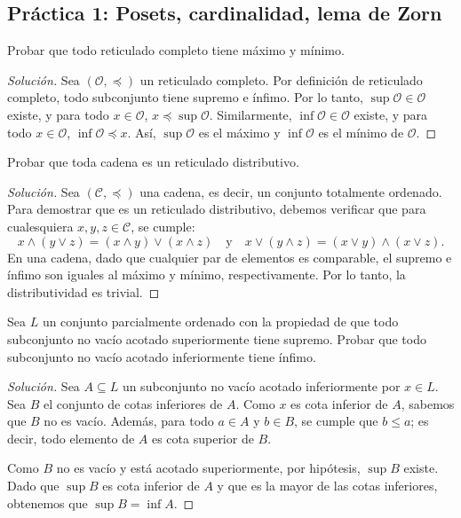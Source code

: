 \subsection*{Práctica 1: Posets, cardinalidad, lema de Zorn}

\begin{exercise}[1]
    Probar que todo reticulado completo tiene máximo y mínimo.
\end{exercise}

\begin{proof}[Solución]
    Sea $(\mathcal{O}, \preceq)$ un reticulado completo. Por definición de reticulado completo, todo subconjunto tiene supremo e ínfimo. Por lo tanto, $\sup \mathcal{O} \in \mathcal{O}$ existe, y para todo $x \in \mathcal{O}$, $x \preceq \sup \mathcal{O}$. Similarmente, $\inf \mathcal{O} \in \mathcal{O}$ existe, y para todo $x \in \mathcal{O}$, $\inf \mathcal{O} \preceq x$. Así, $\sup \mathcal{O}$ es el máximo y $\inf \mathcal{O}$ es el mínimo de $\mathcal{O}$.
\end{proof}

\begin{exercise}[2]
    Probar que toda cadena es un reticulado distributivo.
\end{exercise}

\begin{proof}[Solución]
    Sea $(\mathcal{C}, \preceq)$ una cadena, es decir, un conjunto totalmente ordenado. Para demostrar que es un reticulado distributivo, debemos verificar que para cualesquiera $x, y, z \in \mathcal{C}$, se cumple:
    $$
    x \wedge (y \vee z) = (x \wedge y) \vee (x \wedge z) \quad \text{y} \quad x \vee (y \wedge z) = (x \vee y) \wedge (x \vee z).
    $$
    En una cadena, dado que cualquier par de elementos es comparable, el supremo e ínfimo son iguales al máximo y mínimo, respectivamente. Por lo tanto, la distributividad es trivial.
\end{proof}

\begin{exercise}[3]
    Sea $L$ un conjunto parcialmente ordenado con la propiedad de que todo subconjunto no vacío acotado superiormente tiene supremo. Probar que todo subconjunto no vacío acotado inferiormente tiene ínfimo.
\end{exercise}

\begin{proof}[Solución]
    Sea $A \subseteq L$ un subconjunto no vacío acotado inferiormente por $x \in L$. Sea $B$ el conjunto de cotas inferiores de $A$. Como $x$ es cota inferior de $A$, sabemos que $B$ no es vacío. Además, para todo $a \in A$ y $b \in B$, se cumple que $b \leq a$; es decir, todo elemento de $A$ es cota superior de $B$. 

    Como $B$ no es vacío y está acotado superiormente, por hipótesis, $\sup B$ existe. Dado que $\sup B$ es cota inferior de $A$ y que es la mayor de las cotas inferiores, obtenemos que $\sup B = \inf A$.
\end{proof}

